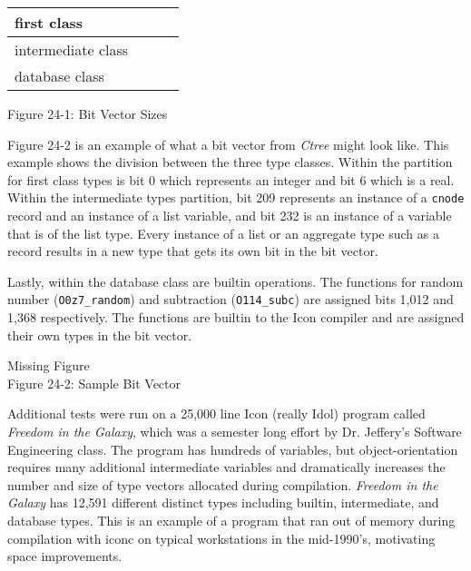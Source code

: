 \begin{center}
\tabletail{}
\tablelasttail{}
\begin{xtabular}{|m{1.2191598in}|m{1.1629599in}|m{1.2455599in}|m{1.6080599in}|}
\hline
 first class &
 &
 &
\raggedleft{}\\\hline
 intermediate class &
 &
 &
\raggedleft{}\\\hline
 database class &
 &
 &
\raggedleft{}\\\hline
\end{xtabular}
\end{center}
{\centering{}
Figure 24-1: Bit Vector Sizes
\par}


Figure 24-2 is an example of what a bit vector from \textit{Ctree}
might look like. This example shows the division between the three
type classes. Within the partition for first class types is bit 0
which represents an integer and bit 6 which is a real. Within the
intermediate types partition, bit 209 represents an instance of a
\texttt{cnode} record and an instance of a list variable, and bit 232
is an instance of a variable that is of the list type. Every instance
of a list or an aggregate type such as a record results in a new type
that gets its own bit in the bit vector.

Lastly, within the database class are builtin operations. The
functions for random number (\texttt{O0z7\_random}) and subtraction
(\texttt{O114\_subc}) are assigned bits 1,012 and 1,368
respectively. The functions are builtin to the Icon compiler and are
assigned their own types in the bit vector.

\bigskip

{\centering{}
  {\color{red} Missing Figure}\\
Figure 24-2: Sample Bit Vector
\par}

Additional tests were run on a 25,000 line Icon (really Idol) program
called \textit{Freedom in the Galaxy}, which was a semester long
effort by Dr. Jeffery's Software Engineering class. The program has
hundreds of variables, but object-orientation requires many additional
intermediate variables and dramatically increases the number and
size of type vectors allocated during compilation. \textit{Freedom in
the Galaxy} has 12,591 different distinct types including builtin,
intermediate, and database types. This is an example of a program that
ran out of memory during compilation with iconc on typical
workstations in the mid-1990's, motivating space improvements.

